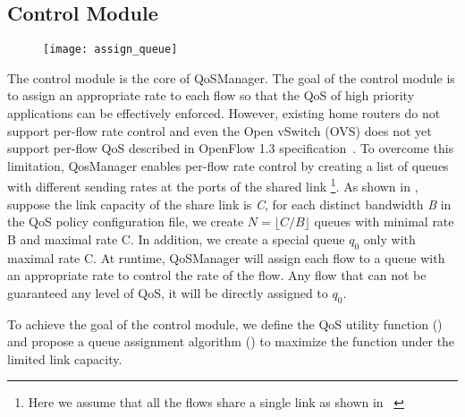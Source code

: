 %

\subsection{Control Module}

\begin{figure}[htb]
  \centering
  \texttt{[image: assign\_queue]}
  \caption{}
  \label{fig:assign_queue}
\end{figure}

The control module is the core of QoSManager. The goal of the control module is to assign an appropriate rate to each flow so that
the QoS of high priority applications can be effectively enforced. However, existing home routers do not support per-flow rate control
and even the Open vSwitch (OVS) does not yet support per-flow QoS described in OpenFlow 1.3 specification~\cite{openflow13}. To overcome
this limitation, QosManager enables per-flow rate control by creating a list of queues with different sending rates at the ports of
the shared link \footnote{Here we assume that all the flows share a single link as shown in ~}. As shown in ,
suppose the link capacity of the share link is \emph{C}, for each distinct bandwidth \emph{B} in the QoS policy configuration file,
we create $ N = \lfloor C / B \rfloor $ queues with minimal rate B and maximal rate C. In addition, we create a special queue $q_0$
only with maximal rate C. At runtime, QoSManager will assign each flow to a queue with an appropriate rate to control the rate of the
flow. Any flow that can not be guaranteed any level of QoS, it will be directly assigned to $q_0$.

To achieve the goal of the control module, we define the QoS utility function () and propose a queue assignment
algorithm () to maximize the function under the limited link capacity.

